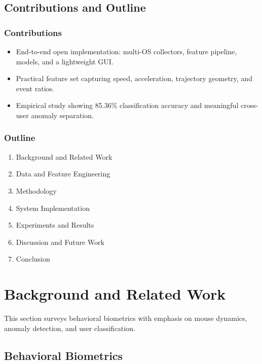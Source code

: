 \documentclass[
  12pt,
]{article}
\providecommand{\tightlist}{%
  \setlength{\itemsep}{0pt}\setlength{\parskip}{0pt}}
\begin{document}
\subsection{Contributions and Outline}\label{contributions-and-outline}

\subsubsection{Contributions}\label{contributions-1}

\begin{itemize}
\tightlist
\item
  End-to-end open implementation: multi-OS collectors, feature pipeline,
  models, and a lightweight GUI.
\item
  Practical feature set capturing speed, acceleration, trajectory
  geometry, and event ratios.
\item
  Empirical study showing 85.36\% classification accuracy and meaningful
  cross-user anomaly separation.
\end{itemize}

\subsubsection{Outline}\label{outline}

\begin{enumerate}
\def\labelenumi{\arabic{enumi}.}
\tightlist
\item
  Background and Related Work
\item
  Data and Feature Engineering
\item
  Methodology
\item
  System Implementation
\item
  Experiments and Results
\item
  Discussion and Future Work
\item
  Conclusion
\end{enumerate}

\section{Background and Related Work}\label{background-and-related-work}

This section surveys behavioral biometrics with emphasis on mouse
dynamics, anomaly detection, and user classification.

\subsection{Behavioral Biometrics}\label{behavioral-biometrics}
\end{document}
